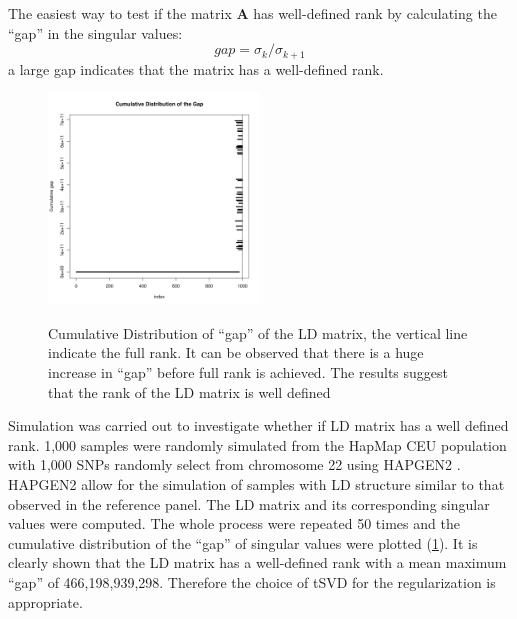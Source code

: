 			The easiest way to test if the matrix $\boldsymbol{A}$ has well-defined rank by calculating the ``gap'' in the singular values:
			\begin{equation}
			gap = \sigma_k/\sigma_{k+1}
			\label{eq:gapSingular}
			\end{equation}
			a large gap indicates that the matrix has a well-defined rank.
			\begin{figure}
				\caption[Cumulative Distribution of ``gap'' of the LD matrix]{Cumulative Distribution of ``gap'' of the LD matrix, the vertical line indicate the full rank. It can be observed that there is a huge increase in ``gap'' before full rank is achieved. 
				The results suggest that the rank of the LD matrix is well defined}
				\centering
				\includegraphics[width=0.5\textwidth]{figure/singular_value_distribution.png}
				\label{fig:singularValueDist}
				\vspace{-20pt}
			\end{figure}
			
			
			Simulation was carried out to investigate whether if \gls{LD} matrix has a well defined rank.
			1,000 samples were randomly simulated from the HapMap \citep{Altshuler2010} \gls{CEU} population with 1,000 \glspl{SNP} randomly select from chromosome 22 using HAPGEN2 \citep{Su2011}.
			HAPGEN2 allow for the simulation of samples with \gls{LD} structure similar to that observed in the reference panel.
			The \gls{LD} matrix and its corresponding singular values were computed. 
			The whole process were repeated 50 times and the cumulative distribution of the ``gap'' of singular values were plotted (\cref{fig:singularValueDist}). 
			It is clearly shown that the \gls{LD} matrix has a well-defined rank with a mean maximum ``gap'' of 466,198,939,298.
			Therefore the choice of \gls{tSVD} for the regularization is appropriate.
			
